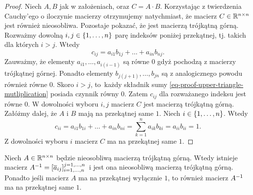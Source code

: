 \documentclass[12pt,a4paper]{report}
\newcommand{\mx}[1]{{#1}}
\begin{document}
\begin{proof}
Niech $\mx{A}, \mx{B}$ jak w założeniach, oraz $\mx{C} = \mx{A} \cdot \mx{B}$. 
Korzystając z twierdzenia Cauchy'ego o iloczynie macierzy otrzymujemy natychmiast, że macierz $\mx{C} \in \setR^{n \times n}$ jest również nieosobliwa. Pozostaje pokazać, że jest macierzą trójkątną górną. Rozważmy dowolną $i,j \in \left\lbrace {1, \ldots, n} \right\rbrace$ parę indeksów poniżej przekątnej, tj. takich dla których $i > j$. Wtedy
\begin{equation}\label{eq-proof-upper-triangle-mutliplication}
c_{ij} = a_{i1} b_{1j} + \ldots +a_{in} b_{nj}.
\end{equation}
Zauważmy, że elementy $a_{i1}, \ldots , a_{i(i-1)}$ są równe $0$ gdyż pochodzą z macierzy trójkątnej górnej. Ponadto elementy $b_{j(j+1)}, \ldots, b_{jn}$ są z analogicznego powodu również równe $0$. Skoro $i > j$, to~każdy składnik sumy \eqref{eq-proof-upper-triangle-mutliplication} posiada czynnik równy $0$. Zatem $c_{ij}$ dla rozważanego indeksu jest równe $0$. W dowolności wyboru $i,j$ macierz $\mx{C}$ jest macierzą trójkątną górną. 
Załóżmy dalej, że $\mx{A}$ i $\mx{B}$ mają na przekątnej same $1$. Niech $i \in \left\lbrace {1, \ldots, n} \right\rbrace$. Wtedy 
$$
c_{ii} = a_{i1} b_{1i}+ \ldots+ a_{in} b_{ni} = \sum_{k=1}^{n} a_{ik} b_{ki} = a_{ii}b_{ii} = 1.
$$
Z dowolności wyboru $i$ macierz $\mx{C}$ ma na przekątnej same $1$. 
\end{proof}

\begin{lemma}\label{lemma-upper-triangle-invertion}
Niech $\mx{A} \in \setR^{n \times n}$ będzie nieosobliwą macierzą trójkątną górną. Wtedy istnieje macierz $\inverse{\mx{A}}=[\overline{a}_{ij}]_{i = 1, \ldots , n}^{j = 1, \ldots, n}$~i jest ona nieosobliwą macierzą trójkątną górną. Ponadto jeśli macierz $\mx{A}$ ma na przekątnej wyłącznie $1$, to również macierz $\inverse{\mx{A}}$ ma na przekątnej same $1$.
\end{lemma}
\end{document}
